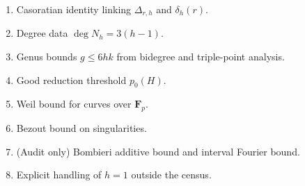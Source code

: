 \documentclass[11pt]{article}
\theoremstyle{remark}
\newcommand{\Fp}{\mathbf F_p}
\begin{document}
\begin{enumerate}
\item Casoratian identity linking $\Delta_{r,h}$ and $\delta_h(r)$.
\item Degree data $\deg N_h = 3(h-1)$.
\item Genus bounds $g \le 6hk$ from bidegree and triple-point analysis.
\item Good reduction threshold $p_0(H)$.
\item Weil bound for curves over $\Fp$.
\item Bezout bound on singularities.
\item (Audit only) Bombieri additive bound and interval Fourier bound.
\item Explicit handling of $h=1$ outside the census.
\end{enumerate}
\end{document}
